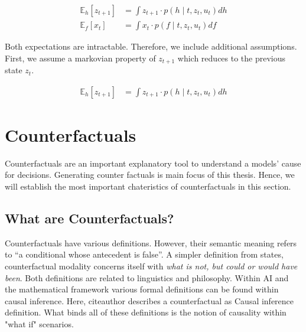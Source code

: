\documentclass[12pt,a4paper]{report}
\begin{document}
\begin{align}
    \label{eq:probablistic_state_space}
    \mathbb{E}_h[z_{t+1}] & =
    \int z_{t+1} \cdot p\left(h \mid t, z_{t}, u_{t}\right) dh\\
    \mathbb{E}_f[x_{t}] & =
    \int x_{t} \cdot p\left(f \mid t, z_{t}, u_{t}\right) df\nonumber
\end{align}

Both expectations are intractable. Therefore, we include additional assumptions. First, we assume a markovian property of $z_{t+1}$ which reduces to the previous state $z_t$. 

\begin{align}
    \mathbb{E}_h[z_{t+1}] & =
    \int z_{t+1} \cdot p\left(h \mid t, z_{t}, u_{t}\right) dh
\end{align}


\section{Counterfactuals}
\label{sec:counterfactuals}
Counterfactuals are an important explanatory tool to understand a models' cause for decisions. Generating counter factuals is main focus of this thesis. Hence, we will establish the most important chateristics of counterfactuals in this section.

\subsection{What are Counterfactuals?}
Counterfactuals have various definitions. However, their semantic meaning refers to \enquote{a conditional whose antecedent is false}\autocite{_Counterfactual_}. A simpler definition from \citeauthor{starr_Counterfactuals_2021} states, counterfactual modality concerns itself with \emph{what is not, but could or would have been}.
Both definitions are related to linguistics and philosophy. Within AI and the mathematical framework various formal definitions can be found within causal inference\autocite{hitchcock_CausalModels_2020}. Here, citeauthor describes a counterfactual as {Causal inference definition}. What binds all of these definitions is the notion of causality within "what if" scenarios.
\end{document}
